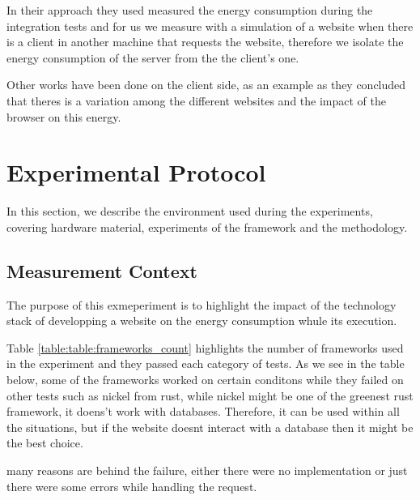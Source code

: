 In their approach they used measured the energy consumption during the integration tests and for us we measure with a simulation of a website when there is a client in another machine that requests the website, therefore we isolate the energy consumption of the server from the the client's one.


Other works have been done on the client side, as an example \cite{philippot_characterization_2014} as they concluded that theres is a variation among the different websites and the impact of the browser on this energy.


\newcommand\duration{20}
\newcommand\parallelclient{512}
\section{Experimental Protocol}

In this section, we describe the environment used during the experiments, covering hardware material, experiments of the framework and the methodology.

\subsection{Measurement Context}
The purpose of this exmeperiment is to highlight the impact of the technology stack of developping a website on the energy consumption whule its execution.

Table \ref{table:table:frameworks_count} highlights the number of frameworks used in the experiment and they passed each category of tests.
As we see in the table below, some of the frameworks worked on certain conditons while they failed on other tests such as nickel from rust, while nickel might be one of the greenest rust framework, it doens't work with databases. Therefore, it can be used within all the situations, but if the website doesnt interact with a database then it might be the best choice.

many reasons are behind the failure, either there were no implementation or just there were some errors while handling the request.




